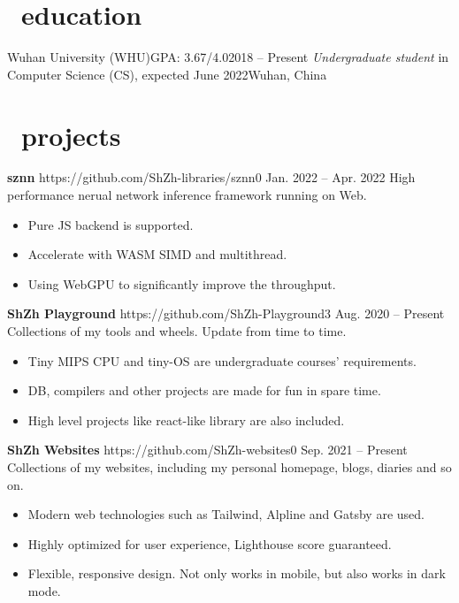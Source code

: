 \documentclass{common}
\begin{document}

\section{\faGraduationCap\ education}
\educationsubsection
    {Wuhan University (WHU)}{GPA: 3.67/4.0}{2018 -- Present}
    {\textit{Undergraduate student} in Computer Science (CS), expected June 2022}{Wuhan, China}

\section{\faCubes\ projects}
\projectsubsection
    {\textbf{sznn}}
    {https://github.com/ShZh-libraries/sznn}{0}
    {Jan. 2022 -- Apr. 2022}
High performance nerual network inference framework running on Web.
\begin{itemize}
    \item Pure JS backend is supported.
    \item Accelerate with WASM SIMD and multithread.
    \item Using WebGPU to significantly improve the throughput.
\end{itemize}
\projectsubsection
    {\textbf{ShZh Playground}}
    {https://github.com/ShZh-Playground}{3}
    {Aug. 2020 -- Present}
Collections of my tools and wheels. Update from time to time.
\begin{itemize}
    \item Tiny MIPS CPU and tiny-OS are undergraduate courses' requirements.
    \item DB, compilers and other projects are made for fun in spare time.
    \item High level projects like react-like library are also included.
\end{itemize}
\projectsubsection
    {\textbf{ShZh Websites}}
    {https://github.com/ShZh-websites}{0}
    {Sep. 2021 -- Present}
Collections of my websites, including my personal homepage, blogs, diaries and so on.
\begin{itemize}
    \item Modern web technologies such as Tailwind, Alpline and Gatsby are used.
    \item Highly optimized for user experience, Lighthouse score guaranteed.
    \item Flexible, responsive design. Not only works in mobile, but also works in dark mode.
\end{itemize}
\end{document}
